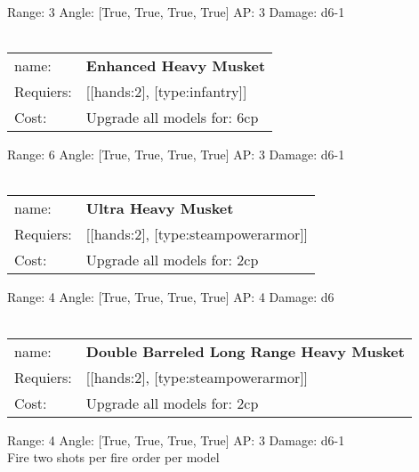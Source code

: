 Range: 3  Angle: [True, True, True, True] AP: 3 Damage: d6-1 \\








\ \\
\begin{tabular}{ll}
name: & {\bf Enhanced Heavy Musket } \\
Requiers: & [[hands:2], [type:infantry]] \\
Cost: & Upgrade all models for: 6cp \\
\end{tabular}



Range: 6  Angle: [True, True, True, True] AP: 3 Damage: d6-1 \\








\ \\
\begin{tabular}{ll}
name: & {\bf Ultra Heavy Musket } \\
Requiers: & [[hands:2], [type:steampowerarmor]] \\
Cost: & Upgrade all models for: 2cp \\
\end{tabular}



Range: 4  Angle: [True, True, True, True] AP: 4 Damage: d6 \\








\ \\
\begin{tabular}{ll}
name: & {\bf Double Barreled Long Range Heavy Musket } \\
Requiers: & [[hands:2], [type:steampowerarmor]] \\
Cost: & Upgrade all models for: 2cp \\
\end{tabular}



Range: 4  Angle: [True, True, True, True] AP: 3 Damage: d6-1 \\
Fire two shots per fire order per model\\ 








